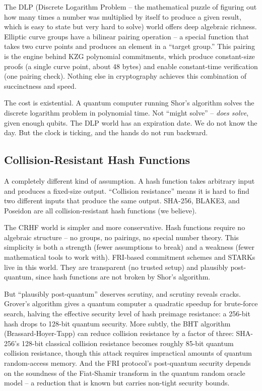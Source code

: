 \documentclass[
  11pt,
  openany]{report}
\begin{document}
The DLP (Discrete Logarithm Problem -- the mathematical puzzle of figuring out
how many times a number was multiplied by itself to produce a given result,
which is easy to state but very hard to solve) world offers deep algebraic
richness. Elliptic curve groups have a bilinear pairing operation -- a special
function that takes two curve points and produces an element in a ``target
group.'' This pairing is the engine behind KZG polynomial commitments, which
produce constant-size proofs (a single curve point, about 48 bytes) and enable
constant-time verification (one pairing check). Nothing else in cryptography
achieves this combination of succinctness and speed.

The cost is existential. A quantum computer running Shor's algorithm solves the
discrete logarithm problem in polynomial time. Not ``might solve'' -- \emph{does
solve}, given enough qubits. The DLP world has an expiration date. We do not
know the day. But the clock is ticking, and the hands do not run backward.

\subsection{Collision-Resistant Hash
Functions}\label{collision-resistant-hash-functions}

A completely different kind of assumption. A hash function takes arbitrary input
and produces a fixed-size output. ``Collision resistance'' means it is hard to
find two different inputs that produce the same output. SHA-256, BLAKE3, and
Poseidon are all collision-resistant hash functions (we believe).

The CRHF world is simpler and more conservative. Hash functions require no
algebraic structure -- no groups, no pairings, no special number theory. This
simplicity is both a strength (fewer assumptions to break) and a weakness (fewer
mathematical tools to work with). FRI-based commitment schemes and STARKs live
in this world. They are transparent (no trusted setup) and plausibly
post-quantum, since hash functions are not broken by Shor's algorithm.

But ``plausibly post-quantum'' deserves scrutiny, and scrutiny reveals cracks.
Grover's algorithm gives a quantum computer a quadratic speedup for brute-force
search, halving the effective security level of hash preimage resistance: a
256-bit hash drops to 128-bit quantum security. More subtly, the BHT algorithm
(Brassard-Hoyer-Tapp) can reduce collision resistance by a factor of three:
SHA-256's 128-bit classical collision resistance becomes roughly 85-bit quantum
collision resistance, though this attack requires impractical amounts of quantum
random-access memory. And the FRI protocol's post-quantum security depends on
the soundness of the Fiat-Shamir transform in the quantum random oracle model --
a reduction that is known but carries non-tight security bounds.
\end{document}
